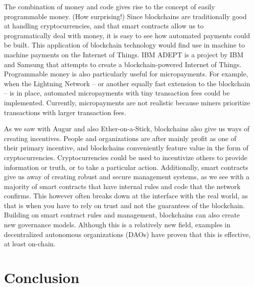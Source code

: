\documentclass[full.tex]{subfiles}
\begin{document}
    The combination of money and code gives rise to the concept of easily programmable money. (How surprising!) Since blockchains are traditionally good at handling cryptocurrencies, and that smart contracts allow us to programatically deal with money, it is easy to see how automated payments could be built. This application of blockchain technology would find use in machine to machine payments on the Internet of Things. IBM ADEPT is a project by IBM and Samsung that attempts to create a blockchain-powered Internet of Things. Programmable money is also particularly useful for micropayments. For example, when the Lightning Network -- or another equally fast extension to the blockchain -- is in place, automated micropayments with tiny transaction fees could be implemented. Currently, micropayments are not realistic because miners prioritize transactions with larger transaction fees.
    
    As we saw with Augur and also Ether-on-a-Stick, blockchains also give us ways of creating incentives. People and organizations are after mainly profit as one of their primary incentive, and blockchains conveniently feature value in the form of cryptocurrencies. Cryptocurrencies could be used to incentivize others to provide information or truth, or to take a particular action. Additionally, smart contracts give us away of creating robust and secure management systems, as we see with a majority of smart contracts that have internal rules and code that the network confirms. This however often breaks down at the interface with the real world, as that is when you have to rely on trust and not the guarantees of the blockchain. Building on smart contract rules and management, blockchains can also create new governance models. Although this is a relatively new field, examples in decentralized autonomous organizations (DAOs) have proven that this is effective, at least on-chain.
    
    
    \section*{Conclusion}
    
\end{document}
